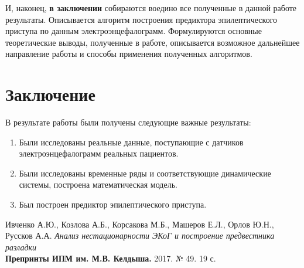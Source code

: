 \documentclass[a4paper,12pt]{report}
\begin{document}
И, наконец, \textbf{в заключении} собираются воедино все полученные в данной работе результаты. Описывается алгоритм построения предиктора эпилептического приступа по данным электроэнцефалограмм. Формулируются основные теоретические выводы, полученные в работе, описывается возможное дальнейшее направление работы и способы применения полученных алгоритмов.


\chapter{Заключение}

В результате работы были получены следующие важные результаты:

\begin{enumerate}
    \item Были исследованы реальные данные, поступающие с датчиков электроэнцефалограмм реальных пациентов.
    \item Были исследованы временные ряды и соответствующие динамические системы, построена математическая модель.
    \item Был построен предиктор эпилептического приступа.
\end{enumerate}


\begin{thebibliography}{9}

Ивченко А.Ю., Козлова А.Б., Корсакова М.Б., Машеров Е.Л., Орлов Ю.Н., Руссков А.А. \textit{Анализ нестационарности ЭКоГ и построение предвестника разладки} \\
\textbf{Препринты ИПМ им. М.В. Келдыша.} 2017. № 49. 19 с.

\end{thebibliography}
\end{document}
